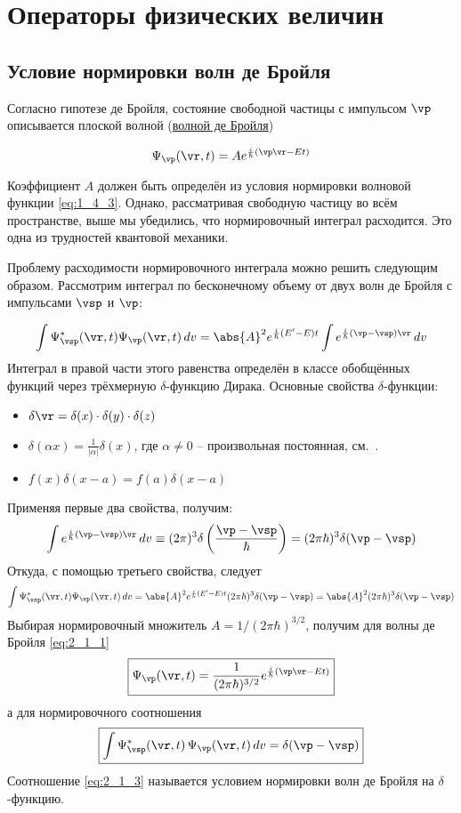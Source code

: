 \chapter{Операторы физических величин}

\section{Условие нормировки волн де Бройля}

Согласно гипотезе де Бройля, состояние свободной частицы с импульсом $\vp$ описывается плоской волной (\underline{волной де Бройля})

\begin{equation}
\label{eq:2_1_1}
\Psi_{\vp}(\vr,t) = A e^{\frac{i}{\hbar}(\vp\vr-Et)}
\end{equation}


Коэффициент $A$ должен быть определён из условия нормировки волновой функции \eqref{eq:1_4_3}. Однако, рассматривая свободную частицу во всём пространстве, выше мы убедились, что нормировочный интеграл расходится. Это одна из трудностей квантовой механики.

Проблему расходимости нормировочного интеграла можно решить следующим образом. Рассмотрим интеграл по бесконечному объему от двух волн де Бройля с импульсами $\vsp$ и $\vp$:

$$
\int \Psi^*_{\vsp}(\vr,t) \Psi_{\vp}(\vr,t) \, dv = 
  \abs{A}^2 e^{\frac{i}{\hbar}(E' - E)t} \int e^{\frac{i}{\hbar}(\vp - \vsp)\vr} \, dv
$$%
%
Интеграл в правой части этого равенства определён в классе обобщённых функций через трёхмерную $\delta$-функцию Дирака. Основные свойства $\delta$-функции:
\begin{itemize}
\item $\delta {\vr} = \delta (x) \cdot \delta (y) \cdot \delta (z) $
\item $\delta (\alpha x) = \frac{1}{|\alpha|} \delta (x)$, где $\alpha \ne 0$ -- произвольная постоянная, см.~.
\item $f(x) \delta (x - a) = f(a) \delta(x-a)$
\end{itemize}%
%
Применяя первые два свойства, получим:
$$
\int e^{\frac{i}{\hbar}(\vp - \vsp)\vr} \, dv \equiv
  (2 \pi )^3 \delta \left( \frac{\vp - \vsp}{\hbar} \right) =
  (2 \pi \hbar)^3 \delta (\vp - \vsp)
$$%
%
Откуда, с помощью третьего свойства, следует
$$
\int \Psi^*_{\vsp}(\vr,t) \Psi_{\vp}(\vr,t) \, dv = 
  \abs{A}^2 e^{\frac{i}{\hbar}(E' - E)t} (2 \pi \hbar)^3 \delta (\vp - \vsp) =
  \abs{A}^2 (2 \pi \hbar)^3 \delta (\vp - \vsp)
$$%
%
Выбирая нормировочный множитель $A = 1/(2 \pi \hbar)^{3/2}$, получим для волны де Бройля \eqref{eq:2_1_1}%
%
\begin{equation}
\label{eq:2_1_2}
\boxed{\Psi_{\vp}(\vr,t) = \frac{1}{(2 \pi \hbar)^{3/2}} e^{\frac{i}{\hbar} (\vp \vr - Et)}}
\end{equation}%
%
а для нормировочного соотношения
\begin{equation}
\label{eq:2_1_3}
\boxed{\int\Psi^*_{\vsp}(\vr,t) \, \Psi_{\vp}(\vr,t) \, dv = \delta (\vp - \vsp)}
\end{equation}%
%
Соотношение \eqref{eq:2_1_3} называется условием нормировки волн де Бройля на $\delta$-функцию.

